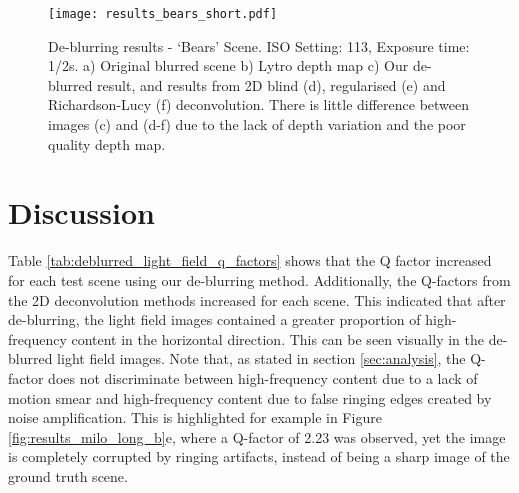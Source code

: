 \begin{figure}[h]
\centering
\texttt{[image: results\_bears\_short.pdf]}
\caption[De-blurring results - \enquote*{Bears} Scene]{
De-blurring results - \enquote*{Bears} Scene.
ISO Setting: 113, Exposure time: 1/2s.
a) Original blurred scene b) Lytro depth map c) Our de-blurred result, and results from 2D blind (d), regularised (e) and Richardson-Lucy (f) deconvolution.
There is little difference between images (c) and (d-f) due to the lack of depth variation and the poor quality depth map.
}
\label{fig:results_bears_short}
\end{figure}



\section{Discussion}
\label{sec:discussion}

Table \ref{tab:deblurred_light_field_q_factors} shows that the Q factor increased for each test scene using our de-blurring method.
Additionally, the Q-factors from the 2D deconvolution methods increased for each scene.
This indicated that after de-blurring, the light field images contained a greater proportion of high-frequency content in the horizontal direction.
This can be seen visually in the de-blurred light field images.
Note that, as stated in section \ref{sec:analysis}, the Q-factor does not discriminate between high-frequency content due to a lack of motion smear and high-frequency content due to false ringing edges created by noise amplification.
This is highlighted for example in Figure \ref{fig:results_milo_long_b}e, where a Q-factor of 2.23 was observed, yet the image is completely corrupted by ringing artifacts, instead of being a sharp image of the ground truth scene.

